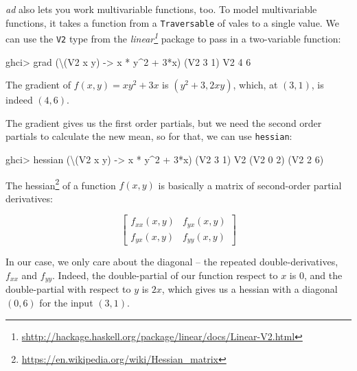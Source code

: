 \documentclass[]{article}
\newenvironment{Shaded}{}{}
\newcommand{\DataTypeTok}[1]{\textcolor[rgb]{0.56,0.13,0.00}{#1}}
\newcommand{\DecValTok}[1]{\textcolor[rgb]{0.25,0.63,0.44}{#1}}
\newcommand{\NormalTok}[1]{#1}
\newcommand{\OperatorTok}[1]{\textcolor[rgb]{0.40,0.40,0.40}{#1}}
\newcommand{\OtherTok}[1]{\textcolor[rgb]{0.00,0.44,0.13}{#1}}
\renewcommand{\href}[2]{#2\footnote{\url{#1}}}
\begin{document}
\emph{ad} also lets you work multivariable functions, too. To model
multivariable functions, it takes a function from a \texttt{Traversable} of
vales to a single value. We can use the \texttt{V2} type from the
\emph{\href{shttp://hackage.haskell.org/package/linear/docs/Linear-V2.html}{linear}}
package to pass in a two-variable function:

\begin{Shaded}
\begin{Highlighting}[]
\NormalTok{ghci}\OperatorTok{\textgreater{}}\NormalTok{ grad (\textbackslash{}(}\DataTypeTok{V2}\NormalTok{ x y) }\OtherTok{{-}\textgreater{}}\NormalTok{ x }\OperatorTok{*}\NormalTok{ y}\OperatorTok{\^{}}\DecValTok{2} \OperatorTok{+} \DecValTok{3}\OperatorTok{*}\NormalTok{x) (}\DataTypeTok{V2} \DecValTok{3} \DecValTok{1}\NormalTok{)}
\DataTypeTok{V2} \DecValTok{4} \DecValTok{6}
\end{Highlighting}
\end{Shaded}

The gradient of \(f(x, y) = x y^2 + 3x\) is \((y^2 + 3, 2xy)\), which, at
\((3, 1)\), is indeed \((4, 6)\).

The gradient gives us the first order partials, but we need the second order
partials to calculate the new mean, so for that, we can use \texttt{hessian}:

\begin{Shaded}
\begin{Highlighting}[]
\NormalTok{ghci}\OperatorTok{\textgreater{}}\NormalTok{ hessian (\textbackslash{}(}\DataTypeTok{V2}\NormalTok{ x y) }\OtherTok{{-}\textgreater{}}\NormalTok{ x }\OperatorTok{*}\NormalTok{ y}\OperatorTok{\^{}}\DecValTok{2} \OperatorTok{+} \DecValTok{3}\OperatorTok{*}\NormalTok{x) (}\DataTypeTok{V2} \DecValTok{3} \DecValTok{1}\NormalTok{)}
\DataTypeTok{V2}\NormalTok{ (}\DataTypeTok{V2} \DecValTok{0} \DecValTok{2}\NormalTok{)}
\NormalTok{   (}\DataTypeTok{V2} \DecValTok{2} \DecValTok{6}\NormalTok{)}
\end{Highlighting}
\end{Shaded}

The \href{https://en.wikipedia.org/wiki/Hessian_matrix}{hessian} of a function
\(f(x,y)\) is basically a matrix of second-order partial derivatives:

\[
\begin{bmatrix}
f_{xx}(x, y) & f_{yx}(x, y) \\
f_{yx}(x, y) & f_{yy}(x, y)
\end{bmatrix}
\]

In our case, we only care about the diagonal -- the repeated double-derivatives,
\(f_{xx}\) and \(f_{yy}\). Indeed, the double-partial of our function respect to
\(x\) is \(0\), and the double-partial with respect to \(y\) is \(2x\), which
gives us a hessian with a diagonal \((0, 6)\) for the input \((3, 1)\).
\end{document}
